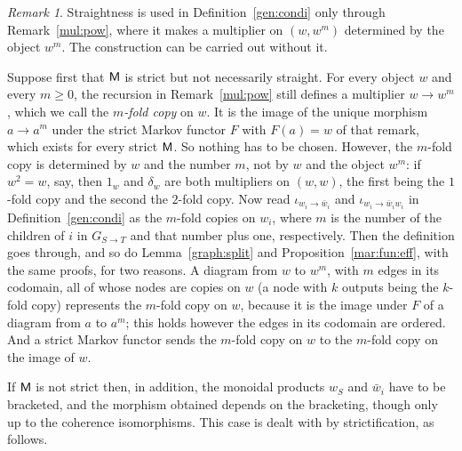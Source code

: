 \documentclass[12pt]{amsart}
\theoremstyle{plain}
\theoremstyle{definition}
\theoremstyle{remark}
\newtheorem{rem}[thm]{Remark}
\numberwithin{equation}{section}
\theoremstyle{plain}
\newcommand{\0}{\emptyset}
\newcommand{\fun}{\longrightarrow}
\newcommand{\cat}[1]{\textup{\textsf{#1}}}
\newcommand{\memph}[1]{{\color{magenta}\emph{#1}}}
\begin{document}
\begin{rem}
\label{non:straight}Straightness is used in Definition~\ref{gen:condi} only through Remark~\ref{mul:pow}, where it makes a multiplier on $(w, w^m)$ determined by the object $w^m$. The construction can be carried out without it.

Suppose first that $\cat M$ is strict but not necessarily straight. For every object $w$ and every $m \geq 0$, the recursion in Remark~\ref{mul:pow} still defines a multiplier $w \fun w^m$, which we call the \memph{$m$-fold copy} on $w$. It is the image of the unique morphism $a \fun a^m$ under the strict Markov functor $F$ with $F(a) = w$ of that remark, which exists for every strict $\cat M$. So nothing has to be chosen. However, the $m$-fold copy is determined by $w$ and the number $m$, not by $w$ and the object $w^m$: if $w^2 = w$, say, then $1_w$ and $\delta_w$ are both multipliers on $(w, w)$, the first being the $1$-fold copy and the second the $2$-fold copy. Now read $\iota_{w_i \rightarrow \bar w_i}$ and $\iota_{w_i \rightarrow \bar w_i w_i}$ in Definition~\ref{gen:condi} as the $m$-fold copies on $w_i$, where $m$ is the number of the children of $i$ in $G_{S \rightarrow T}$ and that number plus one, respectively. Then the definition goes through, and so do Lemma~\ref{graph:split} and Proposition~\ref{mar:fun:eff}, with the same proofs, for two reasons. A diagram from $w$ to $w^m$, with $m$ edges in its codomain, all of whose nodes are copies on $w$ (a node with $k$ outputs being the $k$-fold copy) represents the $m$-fold copy on $w$, because it is the image under $F$ of a diagram from $a$ to $a^m$; this holds however the edges in its codomain are ordered. And a strict Markov functor sends the $m$-fold copy on $w$ to the $m$-fold copy on the image of $w$.

If $\cat M$ is not strict then, in addition, the monoidal products $w_S$ and $\bar w_i$ have to be bracketed, and the morphism obtained depends on the bracketing, though only up to the coherence isomorphisms. This case is dealt with by strictification, as follows.
\end{rem}
\end{document}
